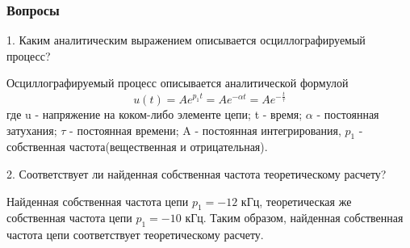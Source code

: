 \subsubsection{Вопросы}

1. Каким аналитическим выражением описывается
осциллографируемый процесс?

Осциллографируемый процесс описывается аналитической формулой
\begin{equation}
  u(t)
  = A e^{p_1 t}
  = A e^{-\alpha t}
  = A e^{-\frac{t}{\tau}}
\end{equation}
где u - напряжение на коком-либо элементе цепи; t - время; $\alpha$ -
постоянная затухания; $\tau$ - постоянная времени; A - постоянная интегрирования,
$p_1$ - собственная частота(вещественная и отрицательная).

2. Соответствует ли найденная собственная частота теоретическому расчету?

Найденная собственная частота цепи $p_1 = -12$ кГц, теоретическая же собственная частота цепи
$p_1 = -10$ кГц. Таким образом, найденная собственная частота цепи соответствует теоретическому расчету.

